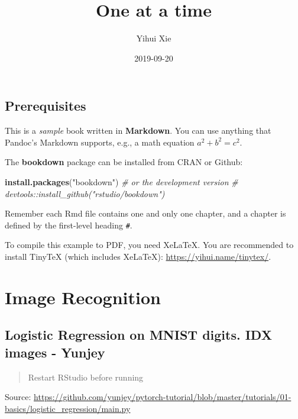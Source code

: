 \documentclass[]{book}
\title{One at a time}
\author{Yihui Xie}
\date{2019-09-20}
\newenvironment{Shaded}{\begin{snugshade}}{\end{snugshade}}
\newcommand{\CommentTok}[1]{\textcolor[rgb]{0.56,0.35,0.01}{\textit{#1}}}
\newcommand{\KeywordTok}[1]{\textcolor[rgb]{0.13,0.29,0.53}{\textbf{#1}}}
\newcommand{\NormalTok}[1]{#1}
\newcommand{\StringTok}[1]{\textcolor[rgb]{0.31,0.60,0.02}{#1}}
\begin{document}
\maketitle

{
\setcounter{tocdepth}{1}
\tableofcontents
}
\hypertarget{prerequisites}{%
\chapter*{Prerequisites}\label{prerequisites}}

This is a \emph{sample} book written in \textbf{Markdown}. You can use anything that Pandoc's Markdown supports, e.g., a math equation \(a^2 + b^2 = c^2\).

The \textbf{bookdown} package can be installed from CRAN or Github:

\begin{Shaded}
\begin{Highlighting}[]
\KeywordTok{install.packages}\NormalTok{(}\StringTok{"bookdown"}\NormalTok{)}
\CommentTok{# or the development version}
\CommentTok{# devtools::install_github("rstudio/bookdown")}
\end{Highlighting}
\end{Shaded}

Remember each Rmd file contains one and only one chapter, and a chapter is defined by the first-level heading \texttt{\#}.

To compile this example to PDF, you need XeLaTeX. You are recommended to install TinyTeX (which includes XeLaTeX): \url{https://yihui.name/tinytex/}.

\hypertarget{part-image-recognition}{%
\part{Image Recognition}\label{part-image-recognition}}

\hypertarget{logistic-regression-on-mnist-digits.-idx-images---yunjey}{%
\chapter{Logistic Regression on MNIST digits. IDX images - Yunjey}\label{logistic-regression-on-mnist-digits.-idx-images---yunjey}}

\begin{quote}
Restart RStudio before running
\end{quote}

Source: \url{https://github.com/yunjey/pytorch-tutorial/blob/master/tutorials/01-basics/logistic_regression/main.py}
\end{document}
